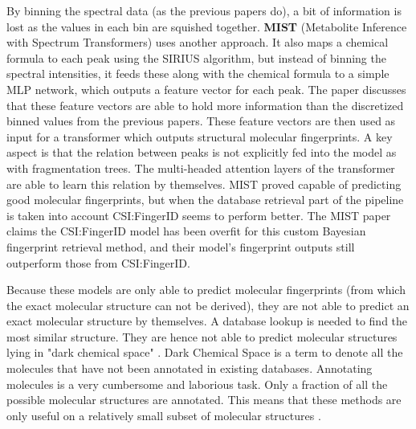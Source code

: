 By binning the spectral data (as the previous papers do), a bit of information is lost as the values in each bin are squished together. \textbf{MIST} \cite{goldman2023annotating} (Metabolite Inference with Spectrum Transformers) uses another approach. It also maps a chemical formula to each peak using the SIRIUS \cite{duhrkop2019sirius} algorithm, but instead of binning the spectral intensities, it feeds these along with the chemical formula to a simple \ac{MLP} network, which outputs a feature vector for each peak. The paper discusses that these feature vectors are able to hold more information than the discretized binned values from the previous papers.
These feature vectors are then used as input for a transformer which outputs structural molecular fingerprints. A key aspect is that the relation between peaks is not explicitly fed into the model as with fragmentation trees. The multi-headed attention layers of the transformer are able to learn this relation by themselves. MIST proved capable of predicting good molecular fingerprints, but when the database retrieval part of the pipeline is taken into account CSI:FingerID seems to perform better. The MIST paper claims the CSI:FingerID model has been overfit for this custom Bayesian fingerprint retrieval method, and their model's fingerprint outputs still outperform those from CSI:FingerID.

Because these models are only able to predict molecular fingerprints
(from which the exact molecular structure can not be derived),
they are not able to predict an exact molecular structure by themselves.
A database lookup is needed to find the most similar structure. They are hence not able to predict molecular structures lying in "dark chemical space" \cite{bushuiev2024emergence}. Dark Chemical Space is a term to denote all the molecules that have not been annotated in existing databases. Annotating molecules is a very cumbersome and laborious task. Only a fraction of all the possible molecular structures are annotated. This means that these methods are only useful on a relatively small subset of molecular structures \cite{bushuiev2024emergence}.

